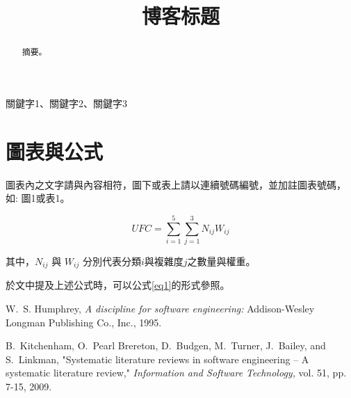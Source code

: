 \documentclass[conference,compsoc]{IEEEtran}
\begin{document}
%
\title{博客标题}

\author{
}

\maketitle

\begin{abstract}
  摘要。
\end{abstract}

\begin{IEEEkeywords}
關鍵字1、關鍵字2、關鍵字3
\end{IEEEkeywords}


\section{圖表與公式}
圖表內之文字請與內容相符\cite{b1, b2}，圖下或表上請以連續號碼編號，並加註圖表號碼，如: 圖1或表1。


\begin{equation}
UFC = \sum_{i=1}^{5} \sum_{j=1}^{3} N_{ij} W_{ij} \label{eq1}
\end{equation}

其中，$N_{ij}$ 與 $W_{ij}$ 分別代表分類$i$與複雜度$j$之數量與權重。
\medskip

於文中提及上述公式時，可以公式\eqref{eq1}的形式參照。


\begin{thebibliography}{1}

W.~S. Humphrey, \emph{A discipline for software engineering:} Addison-Wesley Longman Publishing Co., Inc., 1995.

B.~Kitchenham, O.~Pearl Brereton, D.~Budgen, M.~Turner, J.~Bailey, and S.~Linkman, "Systematic literature reviews in software engineering – A systematic literature review," \emph{Information and Software Technology,} vol. 51, pp. 7-15, 2009.

\end{thebibliography}

\end{document}
